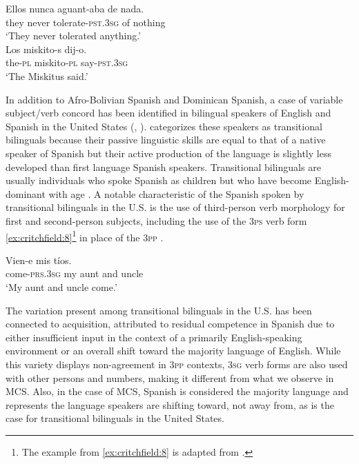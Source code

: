 \documentclass[output=paper,colorlinks,citecolor=brown,
]{langscibook}
\begin{document}
\begin{exe} %
    \ex\label{ex:critchfield:7} 
    \begin{xlist} 
        \ex\label{ex:critchfield:7a} 
            \gll Ellos    nunca    aguant-aba       de    nada.\\  
            they    never  tolerate-\textsc{pst}.\textsc{3sg}      of     nothing\\
            \glt `They never tolerated anything.'\\
        \ex\label{ex:critchfield:7b} 
            \gll  Los          miskito-s      dij-o.\\
             the-\textsc{pl}   miskito-\textsc{pl}   	say-\textsc{pst}.\textsc{3sg}\\
            \glt  `The Miskitus said.'
\end{xlist}
\end{exe}


In addition to Afro-Bolivian Spanish and Dominican Spanish, a case of variable subject/verb concord has been identified in bilingual speakers of English and Spanish in the United States (\citealt{lipski1993creoloid}, \citeyear{lipski2008c}). \citet[56]{lipski2008c} categorizes these speakers as transitional bilinguals because their passive linguistic skills are equal to that of a native speaker of Spanish but their active production of the language is slightly less developed than first language Spanish speakers. Transitional bilinguals are usually individuals who spoke Spanish as children but who have become English-dominant with age \citep[56]{lipski2008c}. A notable characteristic of the Spanish spoken by transitional bilinguals in the U.S. is the use of third-person verb morphology for first and second-person subjects, including the use of the \textsc{3ps} verb form \ref{ex:critchfield:8}\footnote{The example from \ref{ex:critchfield:8} is adapted from \citet[59]{lipski2008c}.} in place of the \textsc{3pp} \citep[59]{lipski2008c}.  

\begin{exe} %
    \ex\label{ex:critchfield:8} 
  \gll Vien-e mis tíos.\\
 come-\textsc{prs}.\textsc{3sg} my {aunt and uncle}\\
 \glt `My aunt and uncle come.'\\
\end{exe}

The variation present among transitional bilinguals in the U.S. has been connected to acquisition, attributed to residual competence in Spanish due to either insufficient input in the context of a primarily English-speaking environment or an overall shift toward the majority language of English. While this variety displays non-agreement in \textsc{3pp} contexts, \textsc{3sg} verb forms are also used with other persons and numbers, making it different from what we observe in MCS. Also, in the case of MCS, Spanish is considered the majority language and represents the language speakers are shifting toward, not away from, as is the case for transitional bilinguals in the United States.
\end{document}
